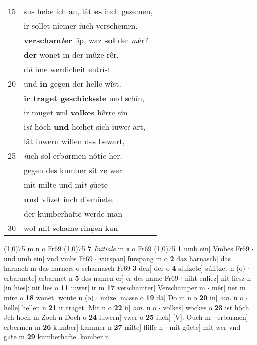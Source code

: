 \documentclass[8pt,a4paper,notitlepage]{article}
\begin{document}
\begin{table}[ht]
\begin{minipage}[t]{0.5\linewidth}
\begin{tabular}{rl}
15 & sus hebe ich an, lât \textbf{es} iuch gezemen,\\ 
 & ir sollet niemer iuch verschemen.\\ 
 & \textbf{verscham\textit{t}er} lîp, waz \textbf{sol} der \textit{m}êr?\\ 
 & \textbf{der} wonet in der mûze rêr,\\ 
 & d\textit{â} ime werdicheit entrîst\\ 
20 & und \textbf{in} gegen der helle wîst.\\ 
 & \textbf{ir traget geschickede} und schîn,\\ 
 & ir muget wol \textbf{volkes} hêrre sîn.\\ 
 & i\textit{st} hôch \textbf{und} hœhet sich iuwer art,\\ 
 & lât iuwern willen des bewart,\\ 
25 & \textit{i}uch sol erb\textit{a}rmen nôtic her.\\ 
 & gegen des kumber sît ze wer\\ 
 & mit milte und mi\textit{t g}üete\\ 
 & \textbf{und} vlîzet iuch diemüete.\\ 
 & der kumberhafte werde man\\ 
30 & wol mit schame ringen kan\\ 
\end{tabular}
\scriptsize
\line(1,0){75} \newline
m n o Fr69 \newline
\line(1,0){75} \newline
\textbf{7} \textit{Initiale} m n o Fr69  \newline
\line(1,0){75} \newline
\textbf{1} umb ein] Vmbes Fr69  $\cdot$ und umb ein] vnd vmbs Fr69  $\cdot$ vürspan] furspang m o \textbf{2} daz harnasch] das harnach m das harners o scharnasch Fr69 \textbf{3} den] der o \textbf{4} siufzete] súfftzet n (o)  $\cdot$ erbarmete] erbarmet n \textbf{5} des namen er] er des name Fr69  $\cdot$ niht enliez] nit liesz n [in hies]: nit lies o \textbf{11} iuwer] ir m \textbf{17} verschamter] Verschamper m  $\cdot$ mêr] ner m mire o \textbf{18} wonet] wonte n (o)  $\cdot$ mûze] masse o \textbf{19} dâ] Do m n o \textbf{20} in] \textit{om.} n o  $\cdot$ helle] hellen n \textbf{21} ir traget] Mit n o \textbf{22} ir] \textit{om.} n o  $\cdot$ volkes] wockes o \textbf{23} ist hôch] Jch hoch m Zoch n Doch o \textbf{24} iuwern] vwer o \textbf{25} iuch] [V]: Ouch m  $\cdot$ erbarmen] erbermen m \textbf{26} kumber] kammer n \textbf{27} milte] fliffe n  $\cdot$ mit güete] mit wer vnd guͦte m \textbf{29} kumberhafte] komber n \newline
\end{minipage}
\end{table}
\end{document}

